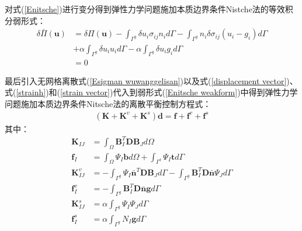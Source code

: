 对式(\ref{Enitsche})进行变分得到弹性力学问题施加本质边界条件Nistche法的等效积分弱形式：
\begin{equation}\label{Enitsche weakform}
\begin{split}
    \delta\bar{\Pi}(\pmb{u})&=\delta\Pi(\pmb{u})-\int_{\Gamma^g}\delta u_i\sigma_{ij}n_id\Gamma-\int_{\Gamma^g}n_i\delta\sigma_{ij}(u_i-g_i)d\Gamma\\
&+\alpha\int_{\Gamma^g}\delta u_iu_id\Gamma-\alpha\int_{\Gamma^g}\delta u_i g_id\Gamma\\
&=0
\end{split}
\end{equation}\par
最后引入无网格离散式(\ref{Esigman wuwanggelisan})以及式(\ref{displacement vector})、式(\ref{strainh})和(\ref{strain vector})代入到弱形式(\ref{Enitsche weakform})中得到弹性力学问题施加本质边界条件Nitsche法的离散平衡控制方程式：
\begin{equation}
\begin{split}
    (\pmb{K}+\pmb{K}^v+\pmb{K}^s)\pmb{d}=\pmb{f}+\pmb{f}^v+\pmb{f}^s
\end{split}
\end{equation}
其中：
\begin{subequations}
\begin{align}
   \pmb K_{I\!J}&=\int_{\Omega}\pmb{B}_I^T\pmb{D}\pmb{B}_Jd\Omega\\
   \pmb f_I&=\int_{\Omega}\Psi_I\pmb{b}d\Omega+\int_{\Gamma^t}\Psi_I\pmb{t}d\Gamma\\
    \pmb K^v_{I\!J}&=-\int_{\Gamma^g}\Psi_I\bar{\pmb{n}}^T\pmb{D}\pmb{B}_Jd\Gamma-\int_{\Gamma^g}\pmb{B}_I^T\pmb{D}\bar{\pmb{n}}\Psi_Jd\Gamma\\
    \pmb f^v_I&=-\int_{\Gamma^g}\pmb{B}_I^T\pmb{D}\bar{\pmb{n}}\pmb{g}d\Gamma\\
   \pmb K^s_{I\!J}&=\alpha\int_{\Gamma^g}\Psi_I\Psi_Jd\Gamma\\
   \pmb f^s_I&=\alpha\int_{\Gamma^g}N_I\pmb{g}d\Gamma
\end{align}
\end{subequations}\par
